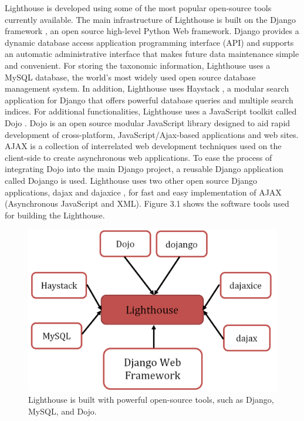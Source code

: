 Lighthouse is developed using some of the most popular open-source tools currently available. The main infrastructure of Lighthouse is built on the Django framework \cite{django}, an open source high-level Python Web framework. Django provides a dynamic database access application programming interface (API) and supports an automatic administrative interface that makes future data maintenance simple and convenient. For storing the taxonomic information, Lighthouse uses a MySQL \cite{mysql} database, the world's most widely used open source database management system. In addition, Lighthouse uses Haystack \cite{haystack}, a modular search application for Django that offers powerful database queries and multiple search indices. For additional functionalities, Lighthouse uses a JavaScript toolkit called Dojo \cite{dojo}. Dojo is an open source modular JavaScript library designed to aid rapid development of cross-platform, JavaScript/Ajax-based applications and web sites. AJAX is a collection of interrelated web development techniques used on the client-side to create asynchronous web applications. To ease the process of integrating Dojo into the main Django project, a reusable Django application called Dojango \cite{dojango} is used. Lighthouse uses two other open source Django applications, dajax and dajaxice \cite{dajax}, for fast and easy implementation of AJAX (Asynchronous JavaScript and XML). Figure 3.1 shows the software tools used for building the Lighthouse.

\begin{figure}[h!]\label{lighthousetools}
  \centering
  \includegraphics[width=5in]{figs/lighthousetools}
  \caption[Tools used for making Lighthouse]
   {Lighthouse is built with powerful open-source tools, such as Django, MySQL, and Dojo.}
\end{figure}


